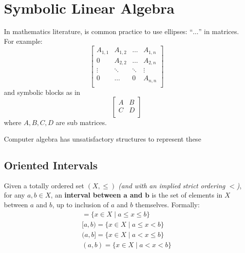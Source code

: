 \chapter{Symbolic Linear Algebra}

In mathematics literature, is common practice to use ellipses: ``$\ldots$'' in matrices.
For example:
\begin{equation}
	\left[
		\begin{array}{cccc}
			A_{1,1} & A_{1,2}	& \ldots 	& A_{1,n} \\
			0		& A_{2,2}	& \ldots	& A_{2,n} \\
 			\vdots 	& \ddots 	& \ddots & \vdots \\
			0		& \ldots 		& 0 		& A_{n,n} \\
		\end{array}
	\right]
\end{equation}
and symbolic blocks as in
\begin{equation}
	\left[
		\begin{array}{c|c}
			A & B \\
			\hline
			C & D \\
		\end{array}
	\right]
\end{equation}
where $A,B,C,D$ are sub matrices.

Computer algebra has unsatisfactory structures to represent these  



\newpage

%
%

\section{Oriented Intervals}

\begin{definition}
	Given a totally ordered set $(X, \leq)$ \emph{(and with an implied strict ordering $<$)}, 
	for any $a,b \in X$, an \textbf{interval between $\boldsymbol{a}$ and $\boldsymbol{b}$} 
	is the set of elements in $X$ between $a$ and $b$, up to inclusion of $a$ and $b$ themselves. 
	Formally:
	\begin{align}
		[a,b] = \{ x \in X \;|\; a \leq x \leq b \} \\
		[a,b) = \{ x \in X \;|\; a \leq x < b \} \\
		(a,b] = \{ x \in X \;|\; a < x \leq b \} \\
		(a,b) = \{ x \in X \;|\; a < x < b \}
	\end{align}
\end{definition}

